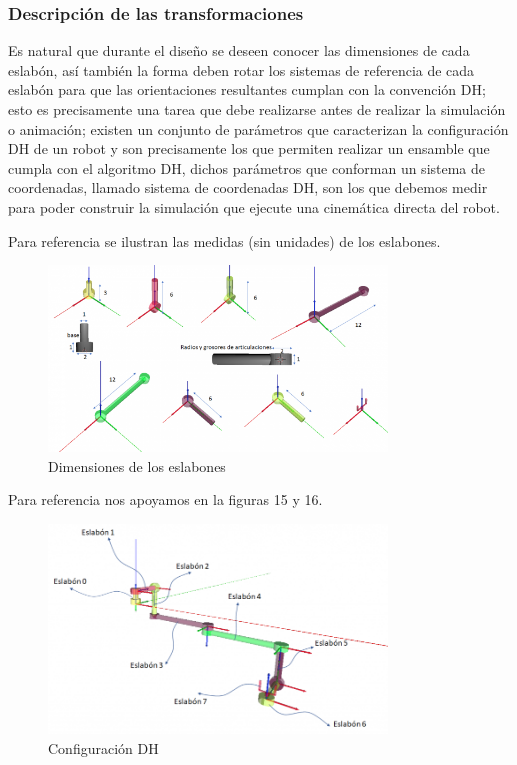 \documentclass[12pt,a4paper]{report}
\begin{document}
\subsubsection{Descripción de las transformaciones}
Es natural que durante el diseño se deseen conocer las dimensiones de cada eslabón, así también la forma deben rotar los sistemas de referencia de cada eslabón para que las orientaciones resultantes  cumplan con la convención DH; esto es precisamente una tarea que debe realizarse antes de realizar la simulación o animación; existen un conjunto de parámetros que caracterizan la configuración DH de un robot y son precisamente los que permiten realizar un ensamble que cumpla con el algoritmo DH, dichos parámetros que conforman un sistema de coordenadas, llamado sistema de coordenadas DH, son los que debemos medir para poder construir la simulación que ejecute una cinemática directa del robot.

Para referencia se ilustran las medidas (sin unidades) de los eslabones.
\begin{figure}[hbtp]
\centering
\includegraphics[width=9cm]{15.png}
\caption{Dimensiones de los eslabones}
\end{figure}
Para referencia nos apoyamos  en la figuras   15 y 16.
\begin{figure}[hbtp]
\centering
\includegraphics[width=9cm]{16.png}
\caption{Configuración DH}
\end{figure}
\end{document}
